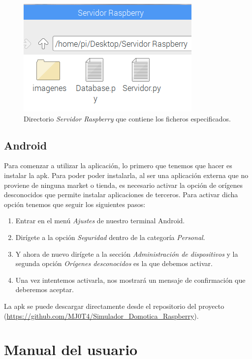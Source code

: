 \begin{figure}[h!]
	\centering
	\includegraphics[width=0.8\linewidth]{img/directorio_servidor}
	\caption{Directorio \textit{Servidor Raspberry} que contiene los ficheros especificados.}
	\label{fig:directorio}
\end{figure}

\subsection{Android}\label{sec:instalacionAndroid}

Para comenzar a utilizar la aplicación, lo primero que tenemos que hacer es instalar la apk. Para poder poder instalarla, al ser una aplicación externa que no proviene de ninguna market o tienda, es necesario activar la opción de orígenes desconocidos que permite instalar aplicaciones de terceros. Para activar dicha opción tenemos que seguir los siguientes pasos:

\begin{enumerate}
	\item Entrar en el menú \textit{Ajustes} de nuestro terminal Android.
	\item Dirígete a la opción \textit{Seguridad} dentro de la categoría \textit{Personal}.
	\item Y ahora de nuevo dirígete a la sección \textit{Administración de dispositivos} y la segunda opción \textit{Orígenes desconocidos} es la que debemos activar.
	\item Una vez intentemos activarla, nos mostrará un mensaje de confirmación que deberemos aceptar. 
\end{enumerate}

La apk se puede descargar directamente desde el repositorio del proyecto (\url{https://github.com/MJ0T4/Simulador_Domotica_Raspberry}).

\section{Manual del usuario}

